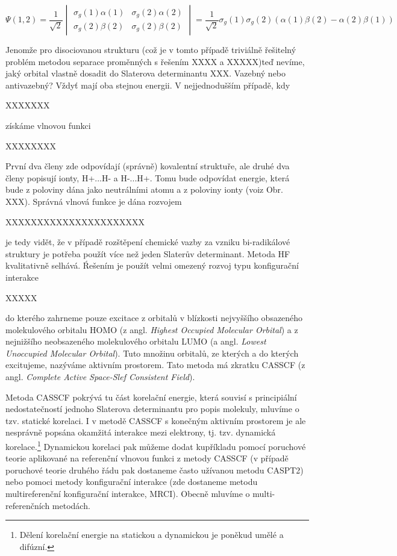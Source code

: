 \begin{equation}
\Psi (1,2)=\frac{1}{\sqrt{2}}
\begin{vmatrix}
\sigma_g(1)\alpha (1) & \sigma_g(2)\alpha (2) \\
\sigma_g(2)\beta (2) & \sigma_g(2)\beta (2)
\end{vmatrix}
=\frac{1}{\sqrt{2}}\sigma_g(1)\sigma_g(2)(\alpha (1)\beta (2)-\alpha (2)\beta (1))
\end{equation}

Jenomže pro disociovanou strukturu (což je v tomto  případě triviálně řešitelný problém metodou separace proměnných s řešením XXXX a XXXXX)teď nevíme, jaký orbital vlastně dosadit do Slaterova determinantu XXX. Vazebný nebo antivazebný? Vždyť mají oba stejnou energii. V nejjednodušším případě, kdy 

XXXXXXX

\noindent získáme vlnovou funkci


XXXXXXXX


\noindent První dva členy zde odpovídají (správně) kovalentní struktuře, ale druhé dva členy popisují ionty, H+...H- a H-...H+. Tomu bude odpovídat energie, která bude z poloviny dána jako neutrálními atomu a z poloviny ionty (voiz Obr. XXX). Správná vlnová funkce je dána rozvojem


XXXXXXXXXXXXXXXXXXXXXX



\noindent je tedy vidět, že v případě rozštěpení chemické vazby za vzniku bi-radikálové struktury je potřeba použít více než jeden Slaterův determinant. Metoda HF kvalitativně selhává. Ŕešením je použít velmi omezený rozvoj typu konfigurační interakce

XXXXX

\noindent do kterého zahrneme pouze excitace z orbitalů v blízkosti nejvyššího obsazeného molekulového orbitalu HOMO (z angl. \textit{Highest Occupied Molecular Orbital}) a z nejnižšího neobsazeného molekulového orbitalu LUMO (a angl. \textit{Lowest Unoccupied Molecular Orbital}). Tuto množinu orbitalů, ze kterých a do kterých excitujeme, nazýváme aktivním prostorem. Tato metoda má zkratku CASSCF (z angl. \textit{Complete Active Space-Slef Consistent Field}). 


Metoda CASSCF pokrývá tu část korelační energie, která souvisí s principiální nedostatečností jednoho Slaterova determinantu pro popis molekuly, mluvíme o tzv. statické korelaci. I v metodě CASSCF s konečným aktivním prostorem je ale nesprávně popsána okamžitá interakce mezi elektrony, tj. tzv. dynamická korelace.\footnote{Dělení korelační energie na statickou a dynamickou je poněkud umělé a difúzní.} Dynamickou korelaci pak můžeme dodat kupříkladu pomocí poruchové teorie aplikované na referenční vlnovou funkci z metody CASSCF (v případě poruchové teorie druhého řádu pak dostaneme často užívanou metodu CASPT2) nebo pomoci metody konfigurační interakce (zde dostaneme metodu multireferenční konfigurační interakce, MRCI). Obecně mluvíme o multi-referenčních metodách.

